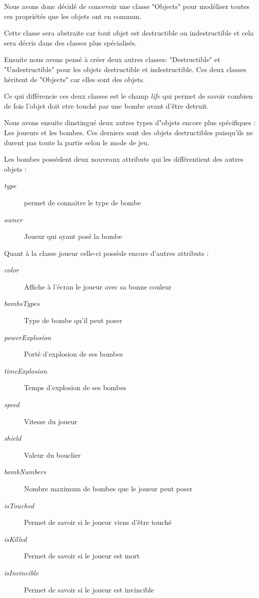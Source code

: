 		Nous avons donc décidé de concevoir une classe "Objects" pour modéliser
		 toutes ces propriétés que les objets ont en commun.
		 
		Cette classe sera abstraite car tout objet est destructible ou 
		indestructible et cela sera décris dans des classes plus spécialisés.
	
	 	Ensuite nous avons pensé à créer deux autres classes: "Destructible" 
	 	et "Undestructible" pour les objets destructible et indestructible.
	 	Ces deux classes héritent de "Objects" car elles sont des objets.
	 	
	 	Ce qui différencie ces deux classes est le champ \textit{life} qui 
	 	permet de savoir combien de fois l'objet doit etre touché par une 
	 	bombe avant d'être detruit.
	
		Nous avons ensuite dinstingué deux autres types d"objets encore plus spécifiques :
		Les joueurs et les bombes.
		Ces derniers sont des objets destructibles puisqu'ils ne durent pas 
		toute la partie selon le mode de jeu.
	
		Les bombes possèdent deux nouveaux attributs qui les différentient 
		des autres objets :
		
			\begin{description}
				\item [\textit{type}]{permet de connaitre le type de bombe}
				\item [\textit{owner}]{Joueur qui ayant posé la bombe}
			\end{description}
			
		Quant à la classe joueur celle-ci possède encore d'autres attributs :
		
		\begin{description}
			\item [\textit{color}]{Affiche à l'écran le joueur avec sa bonne couleur}
			\item [\textit{bombsTypes}]{Type de bombe qu'il peut poser}
			\item [\textit{powerExplosion}]{Porté d'explosion de ses bombes}
			\item [\textit{timeExplosion}]{Temps d'explosion de ses bombes}
			\item [\textit{speed}]{Vitesse du joueur}
			\item [\textit{shield}]{Valeur du bouclier}
			\item [\textit{bombNumbers}]{Nombre maximum de bombes que le joueur peut poser}
			\item [\textit{isTouched}]{Permet de savoir si le joueur viens d'être touché}
			\item [\textit{isKilled}]{Permet de savoir si le joueur est mort}
			\item [\textit{isInvincible}]{Permet de savoir si le joueur est invincible}
		\end{description}
	
